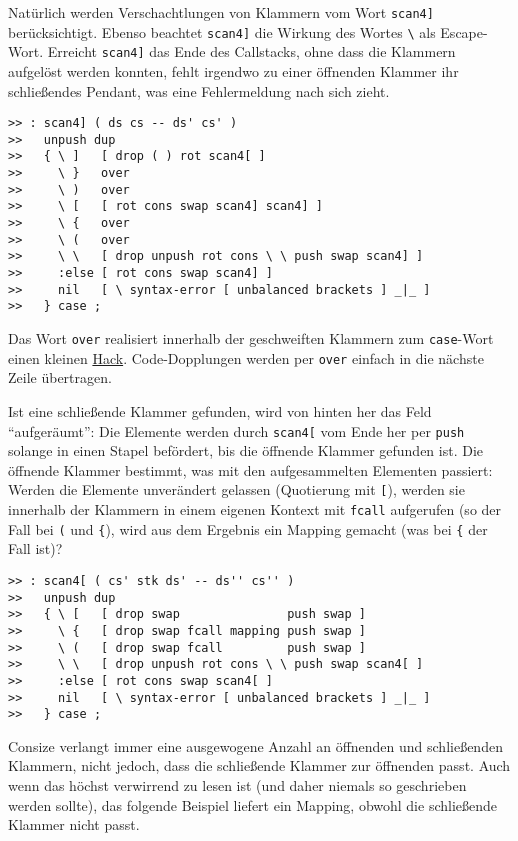 Natürlich werden Verschachtlungen von Klammern vom Wort \verb|scan4]| berücksichtigt. Ebenso beachtet \verb|scan4]| die Wirkung des Wortes \verb|\| als Escape-Wort. Erreicht \verb|scan4]| das Ende des Callstacks, ohne dass die Klammern aufgelöst werden konnten, fehlt irgendwo zu einer öffnenden Klammer ihr schließendes Pendant, was eine Fehlermeldung nach sich zieht.

\begin{verbatim}
>> : scan4] ( ds cs -- ds' cs' )
>>   unpush dup
>>   { \ ]   [ drop ( ) rot scan4[ ]
>>     \ }   over
>>     \ )   over
>>     \ [   [ rot cons swap scan4] scan4] ] 
>>     \ {   over
>>     \ (   over
>>     \ \   [ drop unpush rot cons \ \ push swap scan4] ]
>>     :else [ rot cons swap scan4] ]
>>     nil   [ \ syntax-error [ unbalanced brackets ] _|_ ]
>>   } case ;
\end{verbatim}

Das Wort \verb|over| realisiert innerhalb der geschweiften Klammern zum \verb|case|-Wort einen kleinen \href{http://de.wikipedia.org/wiki/Hack}{Hack}. Code-Dopplungen werden per \verb|over| einfach in die nächste Zeile übertragen.

Ist eine schließende Klammer gefunden, wird von hinten her das Feld "`aufgeräumt"': Die Elemente werden durch \verb|scan4[| vom Ende her per \verb|push| solange in einen Stapel befördert, bis die öffnende Klammer gefunden ist. Die öffnende Klammer bestimmt, was mit den aufgesammelten Elementen passiert: Werden die Elemente unverändert gelassen (Quotierung mit \verb|[|), werden sie innerhalb der Klammern in einem eigenen Kontext mit \verb|fcall| aufgerufen (so der Fall bei \verb|(| und \verb|{|), wird aus dem Ergebnis ein Mapping gemacht (was bei \verb|{| der Fall ist)?

\begin{verbatim}    
>> : scan4[ ( cs' stk ds' -- ds'' cs'' )
>>   unpush dup
>>   { \ [   [ drop swap               push swap ]
>>     \ {   [ drop swap fcall mapping push swap ]
>>     \ (   [ drop swap fcall         push swap ]
>>     \ \   [ drop unpush rot cons \ \ push swap scan4[ ] 
>>     :else [ rot cons swap scan4[ ]
>>     nil   [ \ syntax-error [ unbalanced brackets ] _|_ ]
>>   } case ;
\end{verbatim}

Consize verlangt immer eine ausgewogene Anzahl an öffnenden und schließenden Klammern, nicht jedoch, dass die schließende Klammer zur öff\-nen\-den passt. Auch wenn das höchst verwirrend zu lesen ist (und daher niemals so geschrieben werden sollte), das folgende Beispiel liefert ein Mapping, obwohl die schließende Klammer nicht passt.

